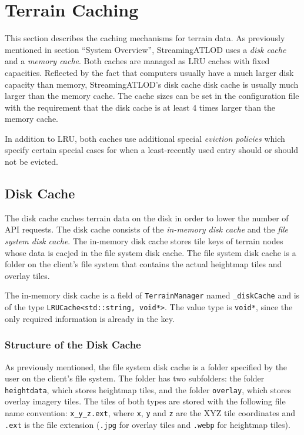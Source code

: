 \section{Terrain Caching}
This section describes the caching mechanisms 
for terrain data. As previously mentioned 
in section ``System Overview'', StreamingATLOD uses a
\textit{disk cache} and a \textit{memory cache}.
Both caches are managed as LRU caches with fixed capacities.
Reflected by the fact that computers usually have a much larger disk capacity 
than memory, StreamingATLOD's disk cache 
disk cache is usually much larger than the memory cache.
The cache sizes can be set in the configuration file with the 
requirement that the disk cache is at least 4 times larger than the memory cache.

In addition to LRU, both caches use additional 
special \textit{eviction policies} which specify certain special 
cases for when a least-recently used entry should or should not be evicted.

\subsection{Disk Cache}
The disk cache caches terrain data on the disk 
in order to lower the number of API requests.
The disk cache consists of the \textit{in-memory disk cache}
and the \textit{file system disk cache}.
The in-memory disk cache stores tile keys of terrain nodes whose data is cacjed 
in the file system disk cache. The file system disk cache is a folder
on the client's file system that contains the 
actual heightmap tiles and overlay tiles.

The in-memory disk cache is a field of \texttt{TerrainManager}
named \texttt{\_diskCache} and is 
of the type \texttt{LRUCache<std::string, void*>}.
The value type is \texttt{void*}, since the only required 
information is already in the key.

\subsubsection{Structure of the Disk Cache}
As previously mentioned, the file system disk cache is a folder specified by the user 
on the client's file system.
The folder has two subfolders: the folder \texttt{heightdata},
which stores heightmap tiles, and the folder \texttt{overlay}, which stores 
overlay imagery tiles.
The tiles of both types are stored with the following file name convention:
\texttt{x\_y\_z.ext}, where \texttt{x}, \texttt{y} and \texttt{z}
are the XYZ tile coordinates and \texttt{.ext} is the file extension (\texttt{.jpg} for overlay 
tiles and \texttt{.webp} for heightmap tiles).

